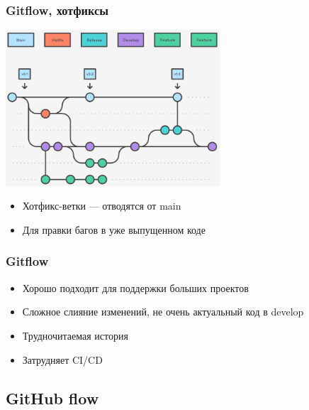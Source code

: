\documentclass{../../slides-style}
\begin{document}
    \begin{frame}
        \frametitle{Gitflow, хотфиксы}
        \begin{center}
            \includegraphics[width=0.6\textwidth]{gitflow4.png}
        \end{center}
        \begin{itemize}
            \item Хотфикс-ветки --- отводятся от main
            \item Для правки багов в уже выпущенном коде
        \end{itemize}
    \end{frame}

    \begin{frame}
        \frametitle{Gitflow}
        \begin{itemize}
            \item Хорошо подходит для поддержки больших проектов
            \item Сложное слияние изменений, не очень актуальный код в develop
            \item Трудночитаемая история
            \item Затрудняет CI/CD
        \end{itemize}
    \end{frame}

    \subsection{GitHub flow}
\end{document}
